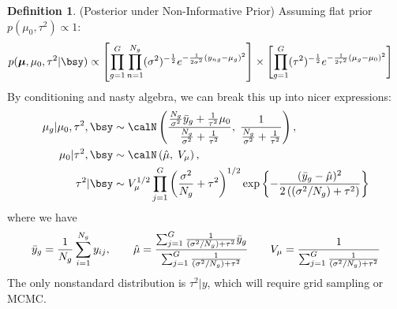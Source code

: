 \documentclass[12pt]{article}
\theoremstyle{plain}
\theoremstyle{definition}
\newtheorem{defn}[thm]{Definition}
\theoremstyle{remark}
\newcommand{\bsmu}{\boldsymbol{\mu}}
\begin{document}
\begin{defn}(Posterior under Non-Informative Prior)
Assuming flat prior $p(\mu_0,\tau^2)\propto 1$:
\begin{align}
  p(\bsmu,\mu_0,\tau^2|\bsy)
  &\propto
  \left[
  \prod_{g=1}^G
  \prod_{n=1}^{N_g}
  (\sigma^2)^{-\frac{1}{2}}
  e^{-\frac{1}{2\sigma^2} (y_{ng} - \mu_g)^2}
  \right]
  \times
  \left[
  \prod_{g=1}^G
  (\tau^2)^{-\frac{1}{2}}
  e^{-\frac{1}{2\tau^2}(\mu_g - \mu_0)^2}
  \right]
  \label{heirarchlik}
\end{align}
By conditioning and nasty algebra, we can break this up into nicer
expressions:
\begin{align*}
   \mu_g | \mu_0, \tau^2, \bsy &\sim \calN\left(\frac{
      \frac{N_g}{\sigma^2} \bar{y}_g
      + \frac{1}{\tau^2}\mu_0}{\frac{N_g}{\sigma^2} + \frac{1}{\tau^2}},
      \; \frac{1}{ \frac{N_g}{\sigma^2} + \frac{1}{\tau^2}} \right),
      \\
   \mu_0 | \tau^2, \bsy &\sim \calN\left( \hat{\mu},
      \;V_\mu\right),\\
   \tau^2 | \bsy &\sim V^{1/2}_\mu
   \prod^G_{j=1} \left(
   \frac{\sigma^2}{N_g} + \tau^2\right)^{1/2}
   \exp \left\{ -\frac{(\bar{y}_g
   -\hat{\mu})^2}{2 \left( (\sigma^2/N_g) + \tau^2\right)}
   \right\}
\end{align*}
where we have
\begin{align*}
  \bar{y}_g = \frac{1}{N_g} \sum^{N_g}_{i=1} y_{ij},
  \qquad
  \hat{\mu} =
    \frac{%
      \sum^G_{j=1} \frac{1}{(\sigma^2/N_g)+\tau^2} \bar{y}_g
    }{%
      \sum^G_{j=1} \frac{1}{(\sigma^2/N_g)+\tau^2}
    }
   \qquad
   V_\mu =
   \frac{1}{\sum^G_{j=1}
	 \frac{1}{(\sigma^2/N_g) + \tau^2}}
\end{align*}
The only nonstandard distribution is $\tau^2 | y$, which will require
grid sampling or MCMC.
\end{defn}
\end{document}
